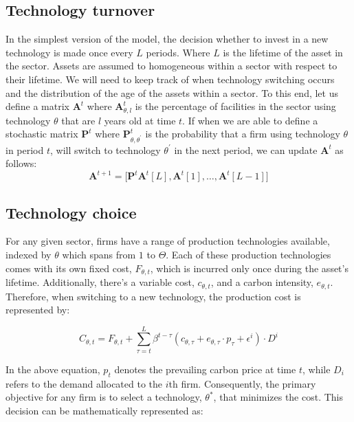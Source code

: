\documentclass{article}
\begin{document}
\subsection{Technology turnover}
In the simplest version of the model, the decision whether to invest in a new technology is made once every \( L \) periods. Where \( L \) is the lifetime of the asset in the sector.
Assets are assumed to homogeneous within a sector with respect to their lifetime. We will need to keep track of when technology switching occurs and the distribution of the age of the assets
within a sector. To this end, let us define a matrix \( \mathbf{A}^t \) where \( \mathbf{A}^t_{\theta, l} \) is the percentage of facilities in the sector using technology \( \theta \) that are \( l \) years old at time \( t \). If when 
we are able to define a stochastic matrix \( \mathbf{P}^t \) where \( \mathbf{P}^t_{\theta, \theta^{'}} \) is the probability that a firm using technology \( \theta \) in period \( t \), will switch to technology \( \theta^{'} \) in the next period, 
we can update \( \mathbf{A}^t \) as follows:
\begin{equation}
    \mathbf{A}^{t+1} = \bigg[\mathbf{P}^t \mathbf{A}^t[L] , \mathbf{A}^t[1], \ldots, \mathbf{A}^t[L-1]\bigg] 
\end{equation}
\subsection{Technology choice}

For any given sector, firms have a range of production technologies available, 
indexed by $\theta$ which spans from $1$ to $\Theta$. Each of these production technologies 
comes with its own fixed cost, $F_{\theta, t}$, which is incurred only once during the 
asset's lifetime. Additionally, there's a variable cost, $c_{\theta, t}$, and a carbon intensity, $e_{\theta, t}$. 
Therefore, when switching to a new technology, the production cost is represented by:

\begin{equation}
    C_{\theta, t} 
    = F_{\theta, t} + 
    \sum_{\tau=t}^{L}\beta^{t-\tau}(c_{\theta, \tau} + e_{\theta, \tau} \cdot p_{\tau} + \epsilon^{i}) \cdot D^{i}
\end{equation}

In the above equation, $p_t$ denotes the prevailing carbon price at time $t$, while $D_i$ refers to the demand allocated to the $i$th firm. 
Consequently, the primary objective for any firm is to select a technology, $\theta^*$, that minimizes the cost. 
This decision can be mathematically represented as:
\end{document}
